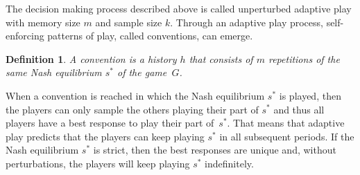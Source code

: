 \documentclass[11.5pt]{article}
\newtheorem{definition}{Definition}
\begin{document}
\bigskip

The decision making process described above is called unperturbed adaptive play with memory size $m$ and sample size $k$. Through an adaptive play process, self-enforcing patterns of play, called conventions, can emerge.


\begin{definition}
A {\emph{convention}} is a history $h$ that consists of $m$ repetitions of the same Nash equilibrium $s^*$ of the game~$G$.
\end{definition}

When a convention is reached in which the Nash equilibrium $s^*$ is played, then the players can only sample the others playing their part of $s^*$ and thus all players have a best response to play their part of~$s^*$. That means that adaptive play predicts that the players can keep playing $s^*$ in all subsequent periods. If the Nash equilibrium $s^*$ is strict, then the best responses are unique and, without perturbations, the players will keep playing $s^*$ indefinitely. 
\end{document}
